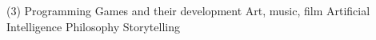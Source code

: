 



\begin{cventries}


\begin{tasks}[style=itemize, label-align=left, item-indent={10mm}](3)%
\task Programming
\task Games and their development
\task Art, music, film
\task Artificial Intelligence
\task Philosophy
\task Storytelling
\end{tasks}

%



\end{cventries}

